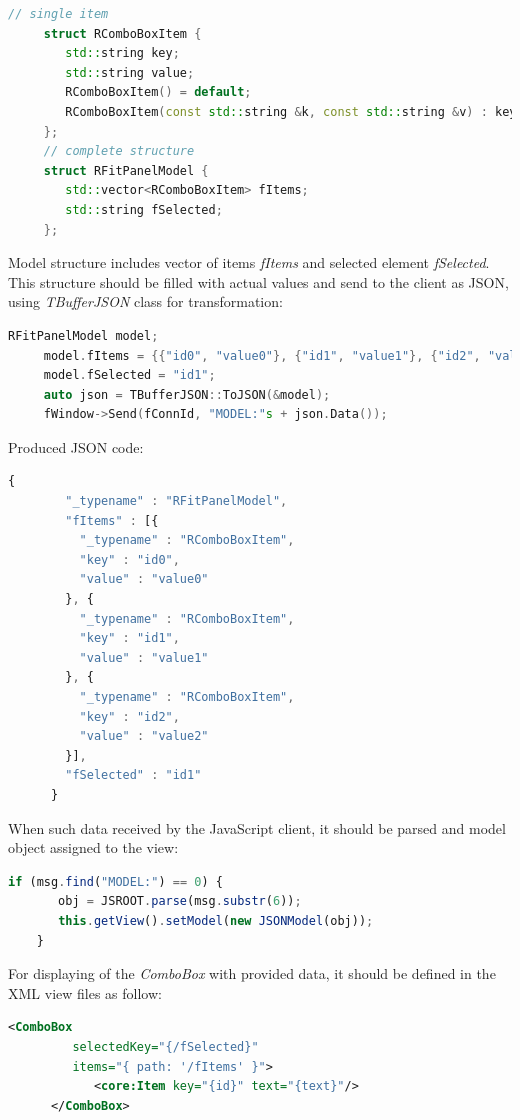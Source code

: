 \documentclass[a4paper]{jpconf}
\begin{document}
\begin{lstlisting}[language=C++,numbers=none]
     // single item
     struct RComboBoxItem {
        std::string key;
        std::string value;
        RComboBoxItem() = default;
        RComboBoxItem(const std::string &k, const std::string &v) : key(k), value(v) {}
     };
     // complete structure 
     struct RFitPanelModel {
        std::vector<RComboBoxItem> fItems;
        std::string fSelected;
     };
\end{lstlisting}

Model structure includes vector of items \textit{fItems} and selected element \textit{fSelected}.
This structure should be filled with actual values and send to the client as JSON, using \textit{TBufferJSON} class for transformation:

\begin{lstlisting}[language=C++,numbers=none]
     RFitPanelModel model;
     model.fItems = {{"id0", "value0"}, {"id1", "value1"}, {"id2", "value2"}};
     model.fSelected = "id1";
     auto json = TBufferJSON::ToJSON(&model);
     fWindow->Send(fConnId, "MODEL:"s + json.Data());
\end{lstlisting}

Produced JSON code:

\begin{lstlisting}[language=JavaScript,numbers=none]
      {
        "_typename" : "RFitPanelModel",
        "fItems" : [{
          "_typename" : "RComboBoxItem",
          "key" : "id0",
          "value" : "value0"
        }, {
          "_typename" : "RComboBoxItem",
          "key" : "id1",
          "value" : "value1"
        }, {
          "_typename" : "RComboBoxItem",
          "key" : "id2",
          "value" : "value2"
        }],
        "fSelected" : "id1"
      }
\end{lstlisting}

When such data received by the JavaScript client, it should be parsed and model object assigned to the view:

\begin{lstlisting}[language=JavaScript,numbers=none]
    if (msg.find("MODEL:") == 0) {
       obj = JSROOT.parse(msg.substr(6));
       this.getView().setModel(new JSONModel(obj));
    }
\end{lstlisting}

For displaying of the \textit{ComboBox} with provided data, it should be defined in the XML view files as follow:

\begin{lstlisting}[language=XML,numbers=none]
      <ComboBox 
         selectedKey="{/fSelected}"
         items="{ path: '/fItems' }">
            <core:Item key="{id}" text="{text}"/>
      </ComboBox>
\end{lstlisting}
\end{document}
